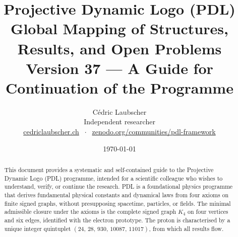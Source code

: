 \documentclass[11pt,a4paper]{article}
\title{Projective Dynamic Logo (PDL)\\[4pt]
\large Global Mapping of Structures, Results, and Open Problems\\[2pt]
\normalsize Version 37 --- A Guide for Continuation of the Programme}
\author{C\'edric Laubscher\\[4pt]
\small Independent researcher\\
\small \href{https://cedriclaubscher.ch}{cedriclaubscher.ch}
$\;\cdot\;$
\small \href{https://zenodo.org/communities/pdl-framework/}{zenodo.org/communities/pdl-framework}}
\date{\today}
\theoremstyle{plain}
\theoremstyle{definition}
\theoremstyle{remark}
\newcommand{\Kfour}{K_4}
\newcommand{\quintuplet}{(24,\,28,\,930,\,10087,\,11017)}
\begin{document}
\maketitle
\setcounter{tocdepth}{2}

\begin{abstract}
This document provides a systematic and self-contained guide to the Projective Dynamic Logo (PDL) programme, intended for a scientific colleague who wishes to understand, verify, or continue the research. PDL is a foundational physics programme that derives fundamental physical constants and dynamical laws from four axioms on finite signed graphs, without presupposing spacetime, particles, or fields. The minimal admissible closure under the axioms is the complete signed graph $\Kfour$ on four vertices and six edges, identified with the electron prototype. The proton is characterised by a unique integer quintuplet $\quintuplet$, from which all results flow.


\end{abstract}
\end{document}
